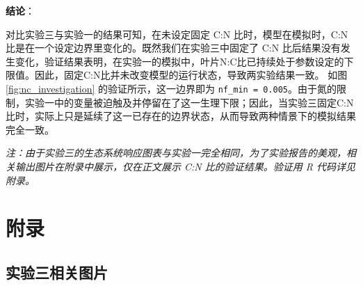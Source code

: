 \documentclass[10pt]{config}
\begin{document}
\vspace{0.5em}
\noindent
\textbf{结论}：

对比实验三与实验一的结果可知，在未设定固定 C:N 比时，模型在模拟时，C:N比是在一个设定边界里变化的。既然我们在实验三中固定了 C:N 比后结果没有发生变化，验证结果表明，在实验一的模拟中，叶片N:C比已持续处于参数设定的下限值。因此，固定C:N比并未改变模型的运行状态，导致两实验结果一致。
如图 \ref{fig:nc_investigation} 的验证所示，这一边界即为 \texttt{nf\_min = 0.005}。由于氮的限制，实验一中的变量被迫触及并停留在了这一生理下限；因此，当实验三固定C:N比时，实际上只是延续了这一已存在的边界状态，从而导致两种情景下的模拟结果完全一致。

\textit{注：由于实验三的生态系统响应图表与实验一完全相同，为了实验报告的美观，相关输出图片在附录中展示，仅在正文展示 C:N 比的验证结果。验证用 R 代码详见附录。}

\section{附录}

\subsection{实验三相关图片}
\label{appendix:exp3_figs}
\end{document}
